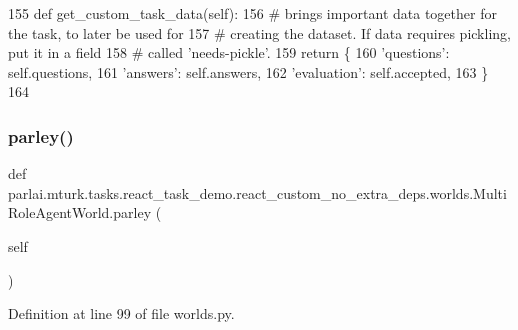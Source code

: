\begin{DoxyCode}
155     \textcolor{keyword}{def }get\_custom\_task\_data(self):
156         \textcolor{comment}{# brings important data together for the task, to later be used for}
157         \textcolor{comment}{# creating the dataset. If data requires pickling, put it in a field}
158         \textcolor{comment}{# called 'needs-pickle'.}
159         \textcolor{keywordflow}{return} \{
160             \textcolor{stringliteral}{'questions'}: self.questions,
161             \textcolor{stringliteral}{'answers'}: self.answers,
162             \textcolor{stringliteral}{'evaluation'}: self.accepted,
163         \}
164 \end{DoxyCode}
\mbox{\label{classparlai_1_1mturk_1_1tasks_1_1react__task__demo_1_1react__custom__no__extra__deps_1_1worlds_1_1MultiRoleAgentWorld_a1831810578aa0f451a012c8c9ea87066}} 
\subsubsection{\texorpdfstring{parley()}{parley()}}
{\footnotesize\ttfamily def parlai.\+mturk.\+tasks.\+react\+\_\+task\+\_\+demo.\+react\+\_\+custom\+\_\+no\+\_\+extra\+\_\+deps.\+worlds.\+Multi\+Role\+Agent\+World.\+parley (\begin{DoxyParamCaption}\item[{}]{self }\end{DoxyParamCaption})}



Definition at line 99 of file worlds.\+py.


